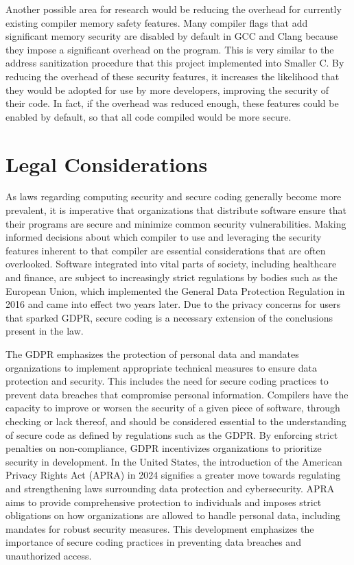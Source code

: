 \documentclass[sigconf, anonymous]{acmart}
\begin{document}
Another possible area for research would be reducing the overhead for currently existing compiler memory safety features. Many compiler flags that add significant memory security are disabled by default in GCC and Clang because they impose a significant overhead on the program. This is very similar to the address sanitization procedure that this project implemented into Smaller C. By reducing the overhead of these security features, it increases the likelihood that they would be adopted for use by more developers, improving the security of their code. In fact, if the overhead was reduced enough, these features could be enabled by default, so that all code compiled would be more secure.



\section{Legal Considerations}
\label{legal considerations}

As laws regarding computing security and secure coding generally become more prevalent, it is imperative that organizations that distribute software ensure that their programs are secure and minimize common security vulnerabilities. Making informed decisions about which compiler to use and leveraging the security features inherent to that compiler are essential considerations that are often overlooked. Software integrated into vital parts of society, including healthcare and finance, are subject to increasingly strict regulations by bodies such as the European Union, which implemented the General Data Protection Regulation in 2016\cite{gdpr2016} and came into effect two years later. Due to the privacy concerns for users that sparked GDPR, secure coding is a necessary extension of the conclusions present in the law.

The GDPR emphasizes the protection of personal data and mandates organizations to implement appropriate technical measures to ensure data protection and security. This includes the need for secure coding practices to prevent data breaches that compromise personal information. Compilers have the capacity to improve or worsen the security of a given piece of software, through checking or lack thereof, and should be considered essential to the understanding of secure code as defined by regulations such as the GDPR. By enforcing strict penalties on non-compliance, GDPR incentivizes organizations to prioritize security in development. In the United States, the introduction of the American Privacy Rights Act (APRA) in 2024 signifies a greater move towards regulating and strengthening laws surrounding data protection and cybersecurity\cite{apra2024}. APRA aims to provide comprehensive protection to individuals and imposes strict obligations on how organizations are allowed to handle personal data, including mandates for robust security measures. This development emphasizes the importance of secure coding practices in preventing data breaches and unauthorized access.
\end{document}

